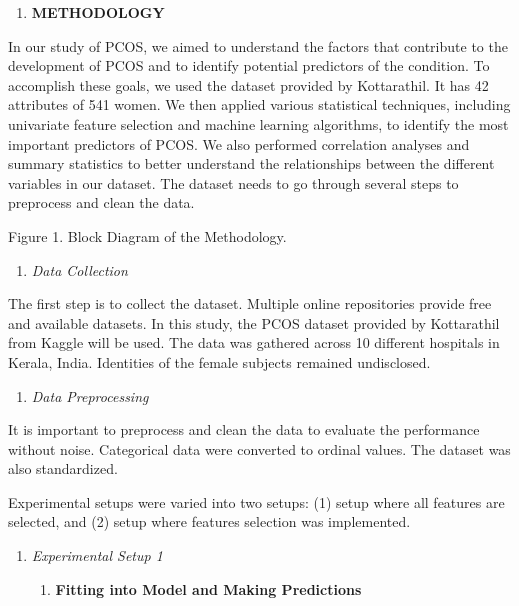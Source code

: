 \documentclass[
]{article}
\begin{document}
\begin{enumerate}
\def\labelenumi{\Roman{enumi}.}
\setcounter{enumi}{1}
\item
  \textbf{METHODOLOGY}
\end{enumerate}

In our study of PCOS, we aimed to understand the factors that contribute
to the development of PCOS and to identify potential predictors of the
condition. To accomplish these goals, we used the dataset provided by
Kottarathil. It has 42 attributes of 541 women. We then applied various
statistical techniques, including univariate feature selection and
machine learning algorithms, to identify the most important predictors
of PCOS. We also performed correlation analyses and summary statistics
to better understand the relationships between the different variables
in our dataset. The dataset needs to go through several steps to
preprocess and clean the data.

Figure 1. Block Diagram of the Methodology.

\begin{enumerate}
\def\labelenumi{\arabic{enumi}.}
\item
  \emph{Data Collection}
\end{enumerate}

The first step is to collect the dataset. Multiple online repositories
provide free and available datasets. In this study, the PCOS dataset
provided by Kottarathil from Kaggle will be used. The data was gathered
across 10 different hospitals in Kerala, India. Identities of the female
subjects remained undisclosed.

\begin{enumerate}
\def\labelenumi{\arabic{enumi}.}
\setcounter{enumi}{1}
\item
  \emph{Data Preprocessing}
\end{enumerate}

It is important to preprocess and clean the data to evaluate the
performance without noise. Categorical data were converted to ordinal
values. The dataset was also standardized.

Experimental setups were varied into two setups: (1) setup where all
features are selected, and (2) setup where features selection was
implemented.

\begin{enumerate}
\def\labelenumi{\arabic{enumi}.}
\setcounter{enumi}{2}
\item
  \emph{Experimental Setup 1}

  \begin{enumerate}
  \def\labelenumii{\arabic{enumii}.}
  \item
    \textbf{Fitting into Model and Making Predictions}
  \end{enumerate}
\end{enumerate}
\end{document}
